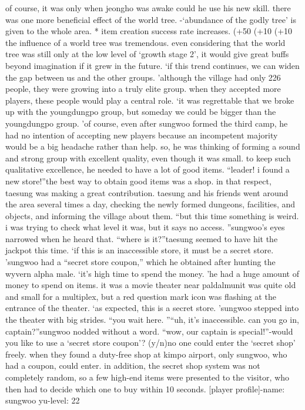  of course, it was only when jeongho was awake could he use his new skill.
there was one more beneficial effect of the world tree.
-‘abundance of the godly tree’ is given to the whole area.
* item creation success rate increases.
 (+50%
 (+10%
 (+10%
the influence of a world tree was tremendous.
 even considering that the world tree was still only at the low level of ‘growth stage 2’, it would give great buffs beyond imagination if it grew in the future.
‘if this trend continues, we can widen the gap between us and the other groups.
’although the village had only 226 people, they were growing into a truly elite group.
when they accepted more players, these people would play a central role.
‘it was regrettable that we broke up with the youngdungpo group, but someday we could be bigger than the youngdungpo group.
’of course, even after sungwoo formed the third camp, he had no intention of accepting new players because an incompetent majority would be a big headache rather than help.
so, he was thinking of forming a sound and strong group with excellent quality, even though it was small.
 to keep such qualitative excellence, he needed to have a lot of good items.
“leader! i found a new store!”the best way to obtain good items was a shop.
 in that respect, taesung was making a great contribution.
 taesung and his friends went around the area several times a day, checking the newly formed dungeons, facilities, and objects, and informing the village about them.
“but this time something is weird.
 i was trying to check what level it was, but it says no access.
”sungwoo’s eyes narrowed when he heard that.
“where is it?”taesung seemed to have hit the jackpot this time.
‘if this is an inaccessible store, it must be a secret store.
’sungwoo had a “secret store coupon,” which he obtained after hunting the wyvern alpha male.
‘it’s high time to spend the money.
’he had a huge amount of money to spend on items.
it was a movie theater near paldalmunit was quite old and small for a multiplex, but a red question mark icon was flashing at the entrance of the theater.
‘as expected, this is a secret store.
’sungwoo stepped into the theater with big strides.
“you wait here.
”“uh, it’s inaccessible.
 can you go in, captain?”sungwoo nodded without a word.
“wow, our captain is special!”-would you like to use a ‘secret store coupon’? (y/n)no one could enter the ‘secret shop’ freely.
 when they found a duty-free shop at kimpo airport, only sungwoo, who had a coupon, could enter.
in addition, the secret shop system was not completely random, so a few high-end items were presented to the visitor, who then had to decide which one to buy within 10 seconds.
[player profile]-name: sungwoo yu-level: 22

